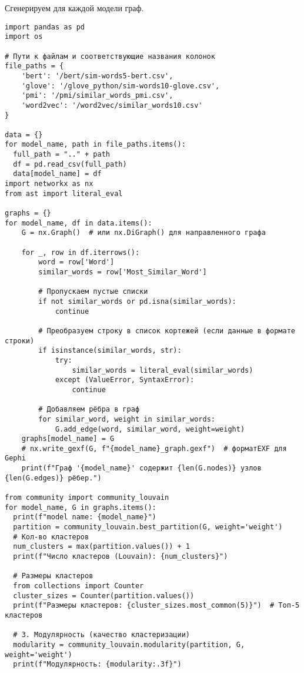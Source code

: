 \documentclass[coursework]{SCWorks}
\begin{document}
Сгенерируем для каждой модели граф.
\begin{verbatim}
import pandas as pd
import os

# Пути к файлам и соответствующие названия колонок
file_paths = {
    'bert': '/bert/sim-words5-bert.csv',
    'glove': '/glove_python/sim-words10-glove.csv',
    'pmi': '/pmi/similar_words_pmi.csv',
    'word2vec': '/word2vec/similar_words10.csv'
}

data = {}
for model_name, path in file_paths.items():
  full_path = ".." + path
  df = pd.read_csv(full_path)
  data[model_name] = df
import networkx as nx
from ast import literal_eval

graphs = {}
for model_name, df in data.items():
    G = nx.Graph()  # или nx.DiGraph() для направленного графа
    
    for _, row in df.iterrows():
        word = row['Word']
        similar_words = row['Most_Similar_Word']
        
        # Пропускаем пустые списки
        if not similar_words or pd.isna(similar_words):
            continue
        
        # Преобразуем строку в список кортежей (если данные в формате строки)
        if isinstance(similar_words, str):
            try:
                similar_words = literal_eval(similar_words)
            except (ValueError, SyntaxError):
                continue
        
        # Добавляем рёбра в граф
        for similar_word, weight in similar_words:
            G.add_edge(word, similar_word, weight=weight)
    graphs[model_name] = G    
    # nx.write_gexf(G, f"{model_name}_graph.gexf")  # форматEXF для Gephi
    print(f"Граф '{model_name}' содержит {len(G.nodes)} узлов {len(G.edges)} рёбер.")

from community import community_louvain
for model_name, G in graphs.items():
  print(f"model name: {model_name}")
  partition = community_louvain.best_partition(G, weight='weight')
  # Кол-во кластеров
  num_clusters = max(partition.values()) + 1
  print(f"Число кластеров (Louvain): {num_clusters}")
  
  # Размеры кластеров
  from collections import Counter
  cluster_sizes = Counter(partition.values())
  print(f"Размеры кластеров: {cluster_sizes.most_common(5)}")  # Топ-5 кластеров

  # 3. Модулярность (качество кластеризации)
  modularity = community_louvain.modularity(partition, G, weight='weight')
  print(f"Модулярность: {modularity:.3f}")
\end{verbatim}
\end{document}
